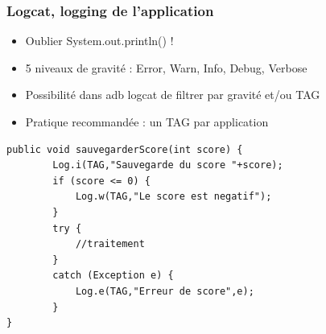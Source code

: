 \documentclass{beamer}
\begin{document}
\begin{frame}[fragile]
\frametitle{Logcat, logging de l'application}
\begin{itemize}
  \item Oublier System.out.println() !
  \item 5 niveaux de gravité : Error, Warn, Info, Debug, Verbose
  \item Possibilité dans adb logcat de filtrer par gravité et/ou TAG
  \item Pratique recommandée : un TAG par application
 \end{itemize}
 \begin{lstlisting}
public void sauvegarderScore(int score) {
        Log.i(TAG,"Sauvegarde du score "+score);
        if (score <= 0) {
            Log.w(TAG,"Le score est negatif");
        }
        try {
            //traitement
        }
        catch (Exception e) {
        	Log.e(TAG,"Erreur de score",e);
        }
}
\end{lstlisting}
\end{frame}
\end{document}

